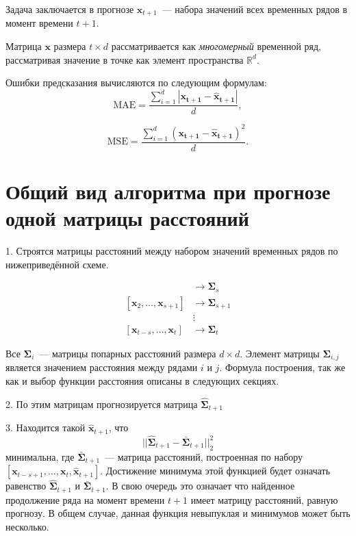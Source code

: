 \documentclass{article}
\begin{document}
Задача заключается в прогнозе $\mathbf{x}_{t+1}$~--- набора значений всех временных рядов в момент времени $t+1$.

Матрица $\mathbf{x}$ размера $t \times d$ рассматривается как \textit{многомерный} временной ряд, рассматривая значение в точке как элемент пространства $\mathbb{R}^d$.

Ошибки предсказания вычисляются по следующим формулам:
\[
\text{MAE} = \frac{\sum_{i=1}^{d} |\mathbf{x_{t+1}} - \mathbf{\hat{x}_{t+1}}|}{d},
\]

\[
\text{MSE} = \frac{\sum_{i=1}^{d} (\mathbf{x_{t+1}} - \mathbf{\hat{x}_{t+1}})^2}{d}.
\]

\section{Общий вид алгоритма при прогнозе одной матрицы расстояний}

1. Строятся матрицы расстояний между набором значений временных рядов по нижеприведённой схеме.

\begin{align*}
	[\mathbf{x}_1, \ldots, \mathbf{x}_s] &\rightarrow \mathbf{\Sigma}_s \\
	[\mathbf{x}_2, \ldots, \mathbf{x}_{s+1}] &\rightarrow \mathbf{\Sigma}_{s+1} \\
	&\vdots \\
	[\mathbf{x}_{t-s}, \ldots, \mathbf{x}_t] &\rightarrow \mathbf{\Sigma}_{t}
\end{align*}

Все $\mathbf{\Sigma}_i$~--- матрицы попарных расстояний размера $d \times d$. Элемент матрицы $\mathbf{\Sigma}_{i,j}$ является значением расстояния между рядами $i$ и $j$. Формула построения, так же как и выбор функции расстояния описаны в следующих секциях.

2. По этим матрицам прогнозируется матрица $\hat{\mathbf{\Sigma}}_{t+1}$

3. Находится такой $\mathbf{\hat{x}}_{t+1}$, что \[ ||\hat{\mathbf{\Sigma}}_{t+1} - \bar{\mathbf{\Sigma}}_{t+1}||_2^2 \] минимальна, где $\bar{\mathbf{\Sigma}}_{t+1}$~--- матрица расстояний, построенная по набору $[\mathbf{x}_{t-s+1}, \ldots, \mathbf{x}_{t}, \mathbf{\hat{x}}_{t+1}]$. Достижение минимума этой функцией будет означать равенство $\hat{\mathbf{\Sigma}}_{t+1}$ и $\bar{\mathbf{\Sigma}}_{t+1}$. В свою очередь это означает что найденное продолжение ряда на момент времени $t+1$ имеет матрицу расстояний, равную прогнозу. В общем случае, данная функция невыпуклая и минимумов может быть несколько.
\end{document}
